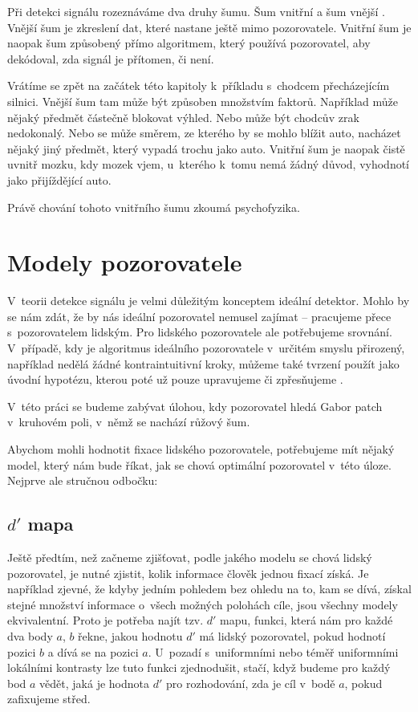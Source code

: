 Při detekci signálu rozeznáváme dva druhy šumu. Šum vnitřní a šum vnější \citep{DavidSDT}.
Vnější šum je zkreslení dat, které nastane ještě mimo pozorovatele. Vnitřní
šum je naopak šum způsobený přímo algoritmem, který používá
pozorovatel, aby dekódoval, zda signál je přítomen, či není.

Vrátíme se zpět na začátek této kapitoly k~příkladu s~chodcem přecházejícím silnici.
Vnější šum tam může být způsoben množstvím faktorů. Například může nějaký
předmět částečně blokovat výhled. Nebo může být chodcův zrak nedokonalý. Nebo
se může směrem, ze kterého by se mohlo blížit auto, nacházet nějaký jiný předmět, který
vypadá trochu jako auto. Vnitřní šum je naopak čistě uvnitř mozku, kdy mozek
vjem, u~kterého k~tomu nemá žádný důvod, vyhodnotí jako přijíždějící auto.

Právě chování tohoto vnitřního šumu zkoumá psychofyzika.

\section{Modely pozorovatele}

V~teorii detekce signálu je velmi důležitým konceptem ideální detektor.
Mohlo by se nám zdát, že by nás ideální pozorovatel nemusel zajímat -- pracujeme
přece s~pozorovatelem lidským. Pro lidského pozorovatele ale potřebujeme srovnání.
V~případě, kdy je algoritmus ideálního pozorovatele v~určitém smyslu
přirozený, například nedělá žádné kontraintuitivní kroky, můžeme také tvrzení
 použít jako úvodní hypotézu, kterou
poté už pouze upravujeme či zpřesňujeme \citep{GreenSDT}.

V~této práci se budeme zabývat úlohou, kdy pozorovatel hledá Gabor patch
v~kruhovém poli, v~němž se nachází růžový šum. 

Abychom mohli hodnotit fixace lidského pozorovatele, potřebujeme mít nějaký
model, který nám bude říkat, jak se chová optimální pozorovatel v~této úloze. Nejprve ale
stručnou odbočku:

\subsection{$d'$ mapa}

Ještě předtím, než začneme zjišťovat, podle jakého modelu se chová lidský
pozorovatel, je nutné zjistit, kolik informace člověk jednou fixací získá. Je
například zjevné, že kdyby jedním pohledem bez ohledu na to, kam se dívá,
získal stejné množství informace o~všech možných polohách cíle, jsou všechny
modely ekvivalentní. Proto je potřeba najít tzv. $d'$ mapu, funkci, která nám
pro každé dva body $a$, $b$ řekne, jakou hodnotu $d'$ má lidský pozorovatel,
pokud hodnotí pozici $b$ a dívá se na pozici $a$. U~pozadí s~uniformními nebo
téměř uniformními lokálními kontrasty lze tuto funkci zjednodušit, stačí, když
budeme pro každý bod $a$ vědět, jaká je hodnota $d'$ pro rozhodování, zda je
cíl v~bodě $a$, pokud zafixujeme střed.

